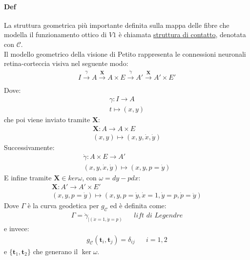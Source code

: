 \paragraph*{Def}La struttura geometrica più importante definita sulla mappa delle fibre che modella il funzionamento ottico di $V1$ è chiamata \underline{struttura di contatto}, denotata con $\mathcal{C}$.\\
Il modello geometrico della visione di Petito rappresenta le connessioni neuronali retina-corteccia visiva nel seguente modo:
\begin{align*}
    I\xrightarrow[]{\gamma}A \xrightarrow[]{\mathbf{X}}A\times E\xrightarrow[]{\dot{\gamma}}A'\xrightarrow[]{\mathbf{X}}A'\times E'
\end{align*}
Dove:
\begin{align*}
    \gamma \colon I \to A\\
    t\mapsto (x,y)
\end{align*}
che poi viene inviato tramite $\mathbf{X}$:
\begin{align*}
    \mathbf{X}\colon A \to A\times E\\
    (x,y)\mapsto (x,y,\dot{x},\dot{y})
\end{align*}
Successivamente:
\begin{align*}
    \dot{\gamma}\colon A\times E\to A'\\
    (x,y,\dot{x},\dot{y})\mapsto (x,y,p=\dot{y})
\end{align*}
E infine tramite $\mathbf{X}\in ker\omega$, con $\omega=dy-pdx$:
\begin{align*}
    \mathbf{X}\colon A'\to A'\times E'\\
    (x,y,p=\dot{y})\mapsto (x,y,p=\dot{y},\dot{x}=1,\dot{y}=p,\dot{p}=\ddot{y})
\end{align*}
Dove $\Gamma$ è la curva geodetica per $g_{\mathcal{C}}$ ed è definita come:
\begin{align*}
    \Gamma= \dot{\gamma}_{|(\dot{x}=1,\dot{y}=p)} && \textit{lift di Legendre}
\end{align*}
e invece:
\begin{align*}
    g_{\mathcal{C}}(\mathbf{t}_i,\mathbf{t}_j)=\delta_{ij}&& i=1,2
\end{align*}
e $\{\mathbf{t}_1,\mathbf{t}_2\}$ che generano il $\ker\omega$.


